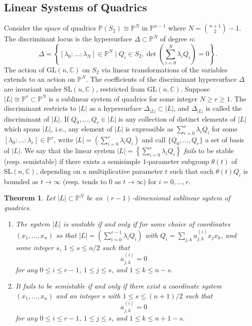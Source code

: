 \documentclass{amsart}[12pt]
\newtheorem{theorem}{Theorem}[section]
\theoremstyle{definition}
\theoremstyle{remark}
\numberwithin{equation}{section}
\newcommand{\abs}[1]{\lvert#1\rvert}
\begin{document}
\subsection{Linear Systems of Quadrics}
Consider the space of quadrics $\mathbb{P}(S_2) \cong \mathbb{P}^{N}$ in $\mathbb{P}^{n - 1}$ where $N = {n + 1 \choose 2} - 1$. The discriminant locus is the hypersurface $\Delta \subset \mathbb{P}^{N}$ of degree $n$: 
\[
\Delta = \left\{ [\lambda_0 \colon \dots \colon \lambda_{N}] \in \mathbb{P}^{N} \mid Q_i \in S_2, \det\left(\sum_{i = 0}^{N} \lambda_i Q_i\right) = 0\right\}.
\]
The action of $\mathrm{GL}(n, \mathbb{C})$ on $S_2$ via linear transformations of the variables extends to an action on $\mathbb{P}^{N}$. The coefficients of the discriminant hypersurface $\Delta$ are invariant under $\mathrm{SL}(n, \mathbb{C})$, restricted from $\mathrm{GL}(n, \mathbb{C})$. Suppose $\abs{L} \cong \mathbb{P}^{r} \subset \mathbb{P}^{N}$ is a sublinear system of quadrics for some integer $N \geq r \geq 1$. The discriminant restricts to $\abs{L}$ as a hypersurface $\Delta_{\abs{L}} \subset \abs{L}$, and $\Delta_{\abs{L}}$ is called the discriminant of $\abs{L}$. If $Q_0, \dots, Q_{r} \in \abs{L}$ is any collection of distinct elements of $\abs{L}$ which spans $\abs{L}$, i.e., any element of $\abs{L}$ is expressible as $\sum_{i = 0}^{r} \lambda_i Q_i$ for some $[\lambda_0 \colon \dots \colon \lambda_{r}] \in \mathbb{P}^{r}$, write $\abs{L} = \left(\sum_{i = 0}^{r} \lambda_i Q_i\right)$ and call $\{Q_0, \dots, Q_{r}\}$ a set of basis of $\abs{L}$. We say that the linear system $\abs{L} = \left\{\sum_{i = 0}^{r} \lambda_i Q_i\right\}$ \textit{fails} to be stable (resp. semistable) if there exists a semisimple $1$-parameter subgroup $\theta(t)$ of $\mathrm{SL}(n, \mathbb{C})$, depending on a multiplicative parameter $t$ such that each $\theta(t)Q_i$ is bounded as $t \to \infty$ (resp. tends to $0$ as $t \to \infty$) for $i = 0, \dots, r$.

\begin{theorem}\cite[Theorem 0.1]{W78} Let $\abs{L} \subset \mathbb{P}^{N}$ be an $(r - 1)$-dimensional sublinear system of quadrics.
\begin{enumerate}
\item The system $\abs{L}$ is unstable if and only if for some choice of coordinates $(x_1, \dots, x_n)$ so that $\abs{L} = \left(\sum_{i = 0}^{r - 1} \lambda_i Q_i\right)$ with $Q_i = \sum_{j, k}a_{j, k}^{(i)}x_jx_k$, and some integer $s$, $1 \leq s \leq n/2$ such that
\[
a_{j, k}^{(i)} = 0
\] 
for any $0 \leq i \leq r - 1$, $1 \leq j \leq s$, and $1 \leq k \leq n - s$.
\item It fails to be semistable if and only if there exist a coordinate system $(x_1, \dots, x_n)$ and an integer $s$ with $1 \leq s \leq (n + 1)/2$ such that 
\[
a_{j, k}^{(i)} = 0
\]
for any $0 \leq i \leq r - 1$, $1 \leq j \leq s$, and $1 \leq k \leq n + 1 - s$.
\end{enumerate}
\end{theorem}
\end{document}
